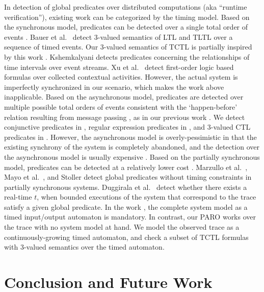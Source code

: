 \documentclass[10pt,conference,compsocconf,letterpaper]{IEEEtran}
\begin{document}
In detection of global predicates over distributed computations (aka ``runtime verification''), existing work can be categorized by the timing model. Based on the synchronous model, predicates can be detected over a single total order of events \cite{Bauer11, Kshemkalyani07, Xu05}. Bauer et al.~\cite{Bauer11} detect 3-valued semantics of LTL and TLTL over a sequence of timed events. Our 3-valued semantics of TCTL is partially inspired by this work \cite{Bauer11}. Kshemkalyani \cite{Kshemkalyani07} detects predicates concerning the relationships of time intervals over event streams. Xu et al.~\cite{Xu05} detect first-order logic based formulas over collected contextual activities. However, the actual system is imperfectly synchronized in our scenario, which makes the work above inapplicable. Based on the asynchronous model, predicates are detected over multiple possible total orders of events consistent with the `happen-before' relation resulting from message passing \cite{Cooper91, Babaoglu93, Schwarz94, Garg96}, as in our previous work \cite{Huang09, Huang12, Yang13, Wei12}. We detect conjunctive predicates in \cite{Huang09, Huang12}, regular expression predicates in \cite{Yang13}, and 3-valued CTL predicates in \cite{Wei12}. However, the asynchronous model is overly-pessimistic in that the existing synchrony of the system is completely abandoned, and the detection over the asynchronous model is usually expensive \cite{Yang13, Wei12}. Based on the partially synchronous model, predicates can be detected at a relatively lower cost \cite{Marzullo91, Mayo95, Stoller00, Duggirala12}. Marzullo et al.~\cite{Marzullo91}, Mayo et al.~\cite{Mayo95}, and Stoller \cite{Stoller00} detect global predicates without timing constraints in partially synchronous systems. Duggirala et al.~\cite{Duggirala12} detect whether there exists a real-time $t$, when bounded executions of the system that correspond to the trace satisfy a given global predicate. In the work \cite{Duggirala12}, the complete system model as a timed input/output automaton is mandatory. In contrast, our \textsf{PARO} works over the trace with no system model at hand. We model the observed trace as a continuously-growing timed automaton, and check a subset of TCTL formulas with 3-valued semantics over the timed automaton.

\section{Conclusion and Future Work} \label{sec:Conclusion}
\end{document}
